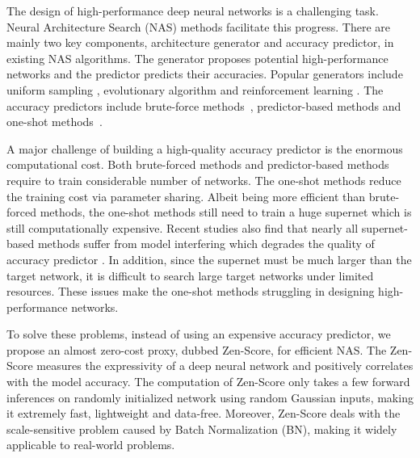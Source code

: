 \documentclass{article}
\providecommand{\citep}{\cite}
\begin{document}
The design of high-performance deep neural networks is a challenging task. Neural Architecture Search (NAS) methods facilitate this progress. There are mainly two key components, architecture generator and accuracy predictor, in existing NAS algorithms. The generator proposes potential high-performance networks and the predictor predicts their accuracies. Popular generators include uniform sampling \citep{guoSinglePathOneShot2020}, evolutionary algorithm \citep{realRegularizedEvolutionImage2019} and reinforcement learning \citep{luoNeuralArchitectureOptimization2018}. The accuracy predictors include brute-force methods~\citep{realLargeScaleEvolutionImage2017,xieGeneticCNN2017,bakerDesigningNeuralNetwork2017,realRegularizedEvolutionImage2019}, predictor-based methods \cite{luoNeuralArchitectureOptimization2018,wenNeuralPredictorNeural2020,luoSemiSupervisedNeuralArchitecture2020} and one-shot methods~\citep{liuDARTSDifferentiableArchitecture2019,xuPCDARTSPartialChannel2019,zhouEcoNASFindingProxies2020, yangCARSContinuousEvolution2020,xieGeneticCNN2017,xieSNASStochasticNeural2018,cai_proxylessnas:_2019,zhangOvercomingMultiModelForgetting2020,wanFBNetV2DifferentiableNeural2020,caiOnceforAllTrainOne2020}.

A major challenge of building a high-quality accuracy predictor is the enormous computational cost. Both brute-forced methods and predictor-based methods require to train considerable number of networks. The one-shot methods reduce the training cost via parameter sharing. Albeit being more efficient than brute-forced methods, the one-shot methods still need to train a huge supernet which is still computationally expensive. Recent studies also find that nearly all supernet-based methods suffer from model interfering  \citep{caiOnceforAllTrainOne2020,yingNASBench101ReproducibleNeural2019} which degrades the quality of accuracy predictor \citep{sciutoEvaluatingSearchPhase2019}. In addition, since the supernet must be much larger than the target network, it is difficult to search large target networks under limited resources. These issues make the one-shot methods struggling in designing high-performance networks.


To solve these problems, instead of using an expensive accuracy predictor, we propose an almost zero-cost proxy, dubbed Zen-Score, for efficient NAS. The Zen-Score measures the expressivity \cite{pooleExponentialExpressivityDeep2016,maithraraghuExpressivePowerDeep2017} of a deep neural network and positively correlates with the model accuracy. The computation of Zen-Score only takes a few forward inferences on randomly initialized network using random Gaussian inputs, making it extremely fast, lightweight and data-free. Moreover, Zen-Score deals with the scale-sensitive problem caused by Batch Normalization (BN)\cite{bartlettSpectrallynormalizedMarginBounds2017,neyshaburRoleOverparametrizationGeneralization2018}, making it widely applicable to real-world problems. 
\end{document}
